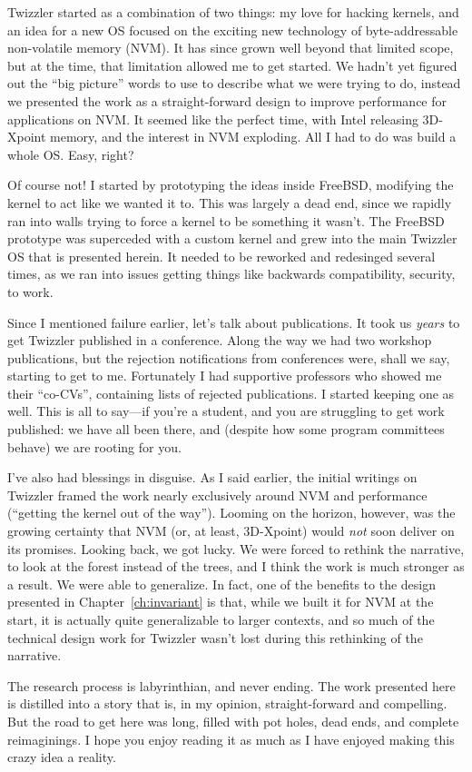 Twizzler started as a combination of two things: my love for hacking kernels, and an idea for a new OS focused on the
exciting new technology of byte-addressable non-volatile memory (NVM). It has since grown well beyond that limited
scope, but at the time, that limitation allowed me to get started. We hadn't yet figured out the ``big picture'' words
to use to describe what we were trying to do, instead we presented the work as a straight-forward design to improve
performance for applications on NVM. It seemed like the perfect time, with Intel releasing 3D-Xpoint memory, and the
interest in NVM exploding. All I had to do was build a whole OS. Easy, right?

Of course not! I started by prototyping the ideas inside FreeBSD, modifying the kernel to act like we wanted it to. This
was largely a dead end, since we rapidly ran into walls trying to force a \unix kernel to be something it wasn't. The
FreeBSD prototype was superceded with a custom kernel and grew into the main Twizzler OS that is presented herein. It
needed to be reworked and redesinged several times, as we ran into issues getting things like backwards compatibility,
security, \etc to work.

Since I mentioned failure earlier, let's talk about publications. It took us \emph{years} to get Twizzler published in a
conference. Along the way we had two workshop publications, but the rejection notifications from conferences were, shall
we say, starting to get to me. Fortunately I had supportive professors who showed me their ``co-CVs'', containing lists of
rejected publications. I started keeping one as well. This is all to say---if you're a student, and you are struggling
to get work published: we have all been there, and (despite how some program committees behave) we are rooting for you.

I've also had blessings in disguise. As I said earlier, the initial writings on Twizzler framed the work nearly
exclusively around NVM and performance (``getting the kernel out of the way'').
Looming on the horizon, however, was the growing certainty that NVM (or,
at least, 3D-Xpoint) would \emph{not} soon deliver on its promises. Looking back, we got lucky. We were forced to
rethink the narrative, to look at the forest instead of the trees, and I think the work is much stronger as a result. We
were able to generalize. In fact, one of the benefits to the design presented in Chapter~\ref{ch:invariant} is that,
while we built it for NVM at the start, it is actually quite generalizable to larger contexts, and so much of the
technical design work for Twizzler wasn't lost during this rethinking of the narrative.

The research process is labyrinthian, and never ending.
The work presented here is distilled into a story that is, in my opinion, straight-forward and compelling. But the
road to get here was long, filled with pot holes, dead ends, and complete reimaginings. I hope you enjoy reading it as
much as I have enjoyed making this crazy idea a reality.

\endgroup

